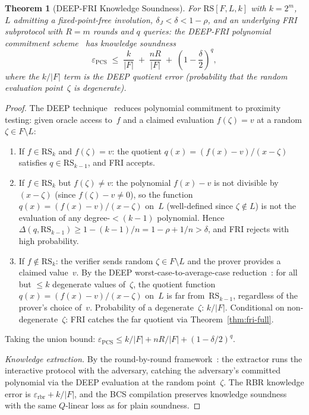 \documentclass[11pt]{article}
\newtheorem{theorem}{Theorem}
\newcommand{\RS}{\mathrm{RS}}
\begin{document}
\begin{theorem}[DEEP-FRI Knowledge Soundness]
\label{thm:deep-fri}
For $\RS[F, L, k]$ with $k = 2^m$, $L$ admitting a fixed-point-free involution, $\delta_J < \delta < 1{-}\rho$, and an underlying FRI subprotocol with $R = m$ rounds and $q$ queries: the DEEP-FRI polynomial commitment scheme~\cite{DEEP} has knowledge soundness
$$\varepsilon_{\mathrm{PCS}} \;\leq\; \frac{k}{|F|} \;+\; \frac{nR}{|F|} \;+\; \left(1 - \frac{\delta}{2}\right)^q,$$
where the $k/|F|$ term is the DEEP quotient error (probability that the random evaluation point~$\zeta$ is degenerate).
\end{theorem}

\begin{proof}
The DEEP technique~\cite{DEEP} reduces polynomial commitment to proximity testing: given oracle access to~$f$ and a claimed evaluation $f(\zeta) = v$ at a random $\zeta \in F \setminus L$:
\begin{enumerate}[nosep]
\item If $f \in \RS_k$ and $f(\zeta) = v$: the quotient $q(x) = (f(x) - v)/(x - \zeta)$ satisfies $q \in \RS_{k-1}$, and FRI accepts.
\item If $f \in \RS_k$ but $f(\zeta) \neq v$: the polynomial $f(x) - v$ is not divisible by $(x - \zeta)$ (since $f(\zeta) - v \neq 0$), so the function $q(x) = (f(x) - v)/(x - \zeta)$ on~$L$ (well-defined since $\zeta \notin L$) is not the evaluation of any degree-${<}(k{-}1)$ polynomial. Hence $\Delta(q, \RS_{k-1}) \geq 1 - (k{-}1)/n = 1{-}\rho + 1/n > \delta$, and FRI rejects with high probability.
\item If $f \notin \RS_k$: the verifier sends random $\zeta \in F \setminus L$ and the prover provides a claimed value~$v$.  By the DEEP worst-case-to-average-case reduction~\cite{DEEP}: for all but $\leq k$ degenerate values of~$\zeta$, the quotient function $q(x) = (f(x) - v)/(x - \zeta)$ on~$L$ is far from~$\RS_{k-1}$, regardless of the prover's choice of~$v$.  Probability of a degenerate~$\zeta$: $k/|F|$.  Conditional on non-degenerate~$\zeta$: FRI catches the far quotient via Theorem~\ref{thm:fri-full}.
\end{enumerate}
Taking the union bound: $\varepsilon_{\mathrm{PCS}} \leq k/|F| + nR/|F| + (1{-}\delta/2)^q$.

\emph{Knowledge extraction.}  By the round-by-round framework~\cite{BGKTTW}: the extractor runs the interactive protocol with the adversary, catching the adversary's committed polynomial via the DEEP evaluation at the random point~$\zeta$.  The RBR knowledge error is $\varepsilon_{\mathrm{rbr}} + k/|F|$, and the BCS compilation preserves knowledge soundness with the same $Q$-linear loss as for plain soundness.
\end{proof}
\end{document}
